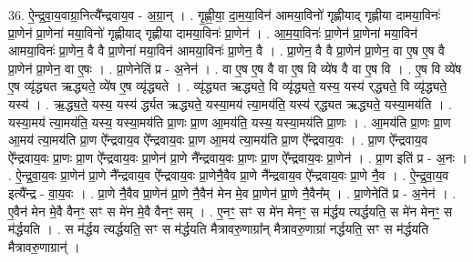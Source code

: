 \documentclass[17pt]{extarticle}
\begin{document}
36. ऐ॒न्द्र॒वा॒य॒वाग्रा॒नित्यै᳚न्द्रवाय॒व - अ॒ग्रा॒न् । . गृ॒ह्णी॒या॒ दा॒म॒या॒विन॑ आमया॒विनो॑ गृह्णीयाद् गृह्णीया दामया॒विनः॑ प्रा॒णेन॑ प्रा॒णेना॑ मया॒विनो॑ गृह्णीयाद् गृह्णीया दामया॒विनः॑ प्रा॒णेन॑ । . आ॒म॒या॒विनः॑ प्रा॒णेन॑ प्रा॒णेना॑ मया॒विन॑ आमया॒विनः॑ प्रा॒णेन॒ वै वै प्रा॒णेना॑ मया॒विन॑ आमया॒विनः॑ प्रा॒णेन॒ वै । . प्रा॒णेन॒ वै वै प्रा॒णेन॑ प्रा॒णेन॒ वा ए॒ष ए॒ष वै प्रा॒णेन॑ प्रा॒णेन॒ वा ए॒षः । . प्रा॒णेनेति॑ प्र - अ॒नेन॑ । . वा ए॒ष ए॒ष वै वा ए॒ष वि व्ये॑ष वै वा ए॒ष वि । . ए॒ष वि व्ये॑ष ए॒ष व्यृ॑द्ध्यत ऋद्ध्यते॒ व्ये॑ष ए॒ष व्यृ॑द्ध्यते । . व्यृ॑द्ध्यत ऋद्ध्यते॒ वि व्यृ॑द्ध्यते॒ यस्य॒ यस्य॑ र्‌द्ध्यते॒ वि व्यृ॑द्ध्यते॒ यस्य॑ । . ऋ॒द्ध्य॒ते॒ यस्य॒ यस्य॑ र्द्ध्यत ऋद्ध्यते॒ यस्या॒मय॑ त्या॒मय॑ति॒ यस्य॑ र्‌द्ध्यत ऋद्ध्यते॒ यस्या॒मय॑ति । . यस्या॒मय॑ त्या॒मय॑ति॒ यस्य॒ यस्या॒मय॑ति प्रा॒णः प्रा॒ण आ॒मय॑ति॒ यस्य॒ यस्या॒मय॑ति प्रा॒णः । . आ॒मय॑ति प्रा॒णः प्रा॒ण आ॒मय॑ त्या॒मय॑ति प्रा॒ण ऐ᳚न्द्रवाय॒व ऐ᳚न्द्रवाय॒वः प्रा॒ण आ॒मय॑ त्या॒मय॑ति प्रा॒ण ऐ᳚न्द्रवाय॒वः । . प्रा॒ण ऐ᳚न्द्रवाय॒व ऐ᳚न्द्रवाय॒वः प्रा॒णः प्रा॒ण ऐ᳚न्द्रवाय॒वः प्रा॒णेन॑ प्रा॒णे नै᳚न्द्रवाय॒वः प्रा॒णः प्रा॒ण ऐ᳚न्द्रवाय॒वः प्रा॒णेन॑ । . प्रा॒ण इति॑ प्र - अ॒नः । . ऐ॒न्द्र॒वा॒य॒वः प्रा॒णेन॑ प्रा॒णे नै᳚न्द्रवाय॒व ऐ᳚न्द्रवाय॒वः प्रा॒णेनै॒वैव प्रा॒णे नै᳚न्द्रवाय॒व ऐ᳚न्द्रवाय॒वः प्रा॒णे नै॒व । . ऐ॒न्द्र॒वा॒य॒व इत्यै᳚न्द्र - वा॒य॒वः । . प्रा॒णे नै॒वैव प्रा॒णेन॑ प्रा॒णे नै॒वैन॑ मेन मे॒व प्रा॒णेन॑ प्रा॒णे नै॒वैन᳚म् । . प्रा॒णेनेति॑ प्र - अ॒नेन॑ । . ए॒वैन॑ मेन मे॒वै वैनꣳ॒॒ सꣳ स मे॑न मे॒वै वैनꣳ॒॒ सम् । . ए॒नꣳ॒॒ सꣳ स मे॑न मेनꣳ॒॒ स म॑र्द्धय त्यर्द्धयति॒ स मे॑न मेनꣳ॒॒ स म॑र्द्धयति । . स म॑र्द्धय त्यर्द्धयति॒ सꣳ स म॑र्द्धयति मैत्रावरु॒णाग्रा᳚न् मैत्रावरु॒णाग्रा॑ नर्द्धयति॒ सꣳ स म॑र्द्धयति मैत्रावरु॒णाग्रान्॑ । \newline
\end{document}
